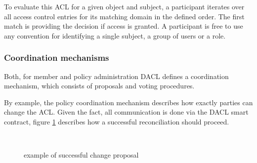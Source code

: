\documentclass[12pt, conference]{IEEEtran}
\begin{document}
To evaluate this ACL for a given object and subject, a participant iterates over all access control entries for its matching domain in the defined order. The first match is providing the decision if access is granted. A participant is free to use any convention for identifying a single subject, a group of users or a role. 


\subsubsection{Coordination mechanisms}

Both, for member and policy administration DACL defines a coordination mechanism, which consists of proposals and voting procedures. 

By example, the policy coordination mechanism describes how exactly parties can change the ACL. Given the fact, all communication is done via the DACL smart contract, figure \ref{fig:proposal-handling} describes how a successful reconciliation should proceed. 

\begin{figure}[!h]
\centering
{} \hfill
{} \hfill
{} \\
\caption{example of successful change proposal}
\label{fig:proposal-handling}
\end{figure}
\end{document}

